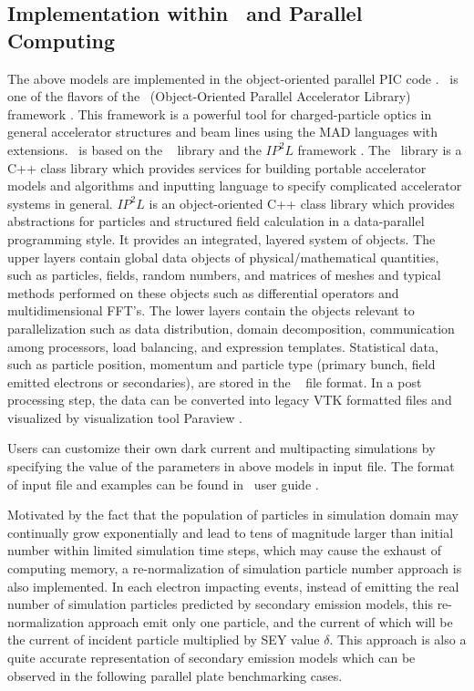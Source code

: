 \documentclass[aps,prstab,superscriptaddress,showpacs]{revtex4-1}
\begin{document}
\subsection{Implementation within \opal\ and Parallel Computing} 
The above models are implemented in the object-oriented parallel PIC code
\opalt. \opalt\ is one of the flavors of the \opal\ (Object-Oriented Parallel Accelerator Library) framework \cite{opal:1}. This framework is a powerful tool for charged-particle optics in general accelerator structures and beam lines using the MAD languages with extensions. \opal\ is based on the \classic\ \cite{Classic:1} library and the $IP^2L$ framework \cite{ippl:1}. The \classic\ library is a C++ class library which provides services for building portable accelerator models and algorithms and inputting language to specify complicated accelerator systems in general. $IP^2L$ is an object-oriented C++ class library which provides abstractions for particles and structured field calculation in a data-parallel programming style. It provides an integrated, layered system of objects. The upper layers contain global data objects of physical/mathematical quantities, such as particles, fields, random numbers, and matrices of meshes and typical methods performed on these objects such as differential operators and multidimensional FFT’s. The lower layers contain the objects relevant to parallelization such as data distribution, domain decomposition, communication among processors, load balancing, and expression templates. Statistical data, such as particle position, momentum and particle type (primary bunch, field emitted electrons or secondaries), are stored in the \hfifepart\ \cite{H5part:1} file format. In a post processing step, the data can be converted into legacy VTK formatted files \cite{vtk:1} and visualized by visualization tool Paraview \cite{paraview}.

Users can customize their own dark current and multipacting simulations by specifying the value of the parameters in above models in input file. The format of input file and examples can be found in \opal\ user guide \cite{opal:1}.

Motivated by the fact that the population of particles in simulation domain may continually grow exponentially and lead to tens of magnitude larger than initial number within limited simulation time steps, which may cause the exhaust of computing memory, a re-normalization of simulation particle number approach is also implemented. In each electron impacting events, instead of emitting the real number of simulation particles predicted by secondary emission models, this re-normalization approach emit only one particle, and the current of which will be the current of incident particle multiplied by SEY value $\delta$. This approach is also a quite accurate representation of secondary emission models which can be observed in the following parallel plate benchmarking cases.
\end{document}
